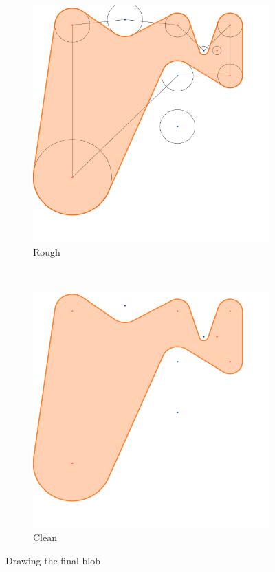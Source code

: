 \documentclass[paper=a4, fontsize=11pt]{scrartcl} %
\numberwithin{equation}{section} %
\numberwithin{figure}{section} %
\numberwithin{table}{section} %
\begin{document}
\begin{figure}
        \centering
        \begin{subfigure}[b]{0.4\textwidth}
                \includegraphics[width=\textwidth]{blob_rough}
                \caption{Rough}
        \end{subfigure}%
        ~ %
        \begin{subfigure}[b]{0.4\textwidth}
                \includegraphics[width=\textwidth]{blob_clean}
                \caption{Clean}
        \end{subfigure}
        \caption{Drawing the final blob}\label{fig:blob}
\end{figure}
\end{document}
